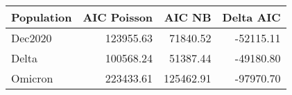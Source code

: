\begin{table}[ht]
\centering
\begin{tabular}{lrrr}
  \hline
Population & AIC Poisson & AIC NB & Delta AIC \\ 
  \hline
Dec2020 & 123955.63 & 71840.52 & -52115.11 \\ 
  Delta & 100568.24 & 51387.44 & -49180.80 \\ 
  Omicron & 223433.61 & 125462.91 & -97970.70 \\ 
   \hline
\end{tabular}
\end{table}
